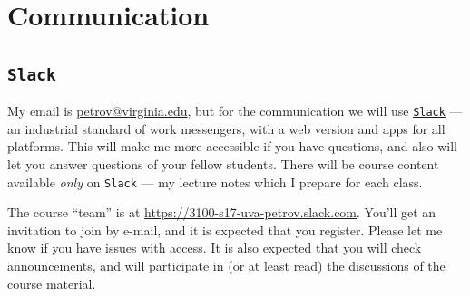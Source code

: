 \documentclass[oneside,11pt]{amsart}
\begin{document}
\section{Communication}
\label{comm}

\subsection{\texttt{Slack}}

My email is \href{mailto:petrov@virginia.edu}{petrov@virginia.edu}, but for the
communication we will use \href{https://slack.com}{\texttt{Slack}} --- an
industrial standard of work messengers, with a web version and apps for all
platforms. This will make me more accessible if you have questions, and also
will let you answer questions of your fellow students. There will be course
content available \emph{only} on \texttt{Slack} --- my
lecture notes which I prepare for each class.

The course ``team'' is at \url{https://3100-s17-uva-petrov.slack.com}. You'll get
an invitation to join by e-mail, and it is expected that you register.
Please
let me know if you have issues with access. 
It is also expected that you
will check announcements, and will participate in (or at least read)
the discussions of the course material.
\end{document}
